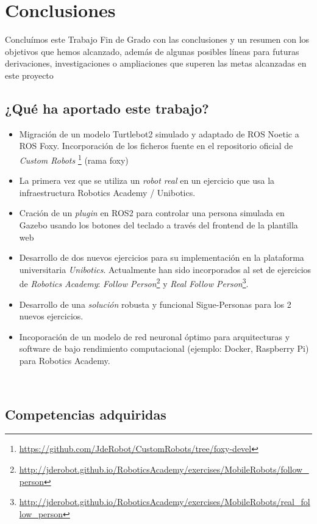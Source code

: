 \chapter{Conclusiones}
\label{cap:Conclusiones}

Concluímos este Trabajo Fin de Grado con las conclusiones y un resumen con los objetivos que hemos alcanzado, además de algunas posibles líneas para futuras derivaciones, investigaciones o ampliaciones que superen las metas alcanzadas en este proyecto

\section{¿Qué ha aportado este trabajo?}
\label{sec:aportaciones}

\begin{itemize}
	\item Migración de un modelo Turtlebot2 simulado y adaptado de ROS Noetic a ROS Foxy. Incorporación de los ficheros fuente en el repositorio oficial de \textit{Custom Robots} \footnote{\url{https://github.com/JdeRobot/CustomRobots/tree/foxy-devel}} (rama foxy)
	\item La primera vez que se utiliza un \textit{robot real} en un ejercicio que usa la infraestructura Robotics Academy / Unibotics.
	\item Cración de un \textit{plugin} en ROS2 para controlar una persona simulada en Gazebo usando los botones del teclado a través del frontend de la plantilla web
	\item Desarrollo de dos nuevos ejercicios para su implementación en la plataforma universitaria \textit{Unibotics}. Actualmente han sido incorporados al set de ejercicios de \textit{Robotics Academy}: \textit{Follow Person}\footnote{\url{http://jderobot.github.io/RoboticsAcademy/exercises/MobileRobots/follow_person}} y \textit{Real Follow Person}\footnote{\url{http://jderobot.github.io/RoboticsAcademy/exercises/MobileRobots/real_follow_person}}.
	\item Desarrollo de una \textit{solución} robusta y funcional Sigue-Personas para los 2 nuevos ejercicios.
	\item Incoporación de un modelo de red neuronal óptimo para arquitecturas y software de bajo rendimiento computacional (ejemplo: Docker, Raspberry Pi) para Robotics Academy.
\end{itemize}\

\section{Competencias adquiridas}
\label{sec:competencias}

